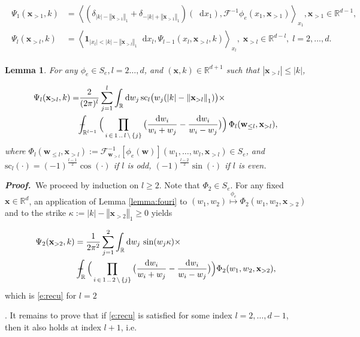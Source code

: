 \documentclass[11pt,A4,twoside]{article}
\newcommand\ind{\mathbf{1}}
\numberwithin{equation}{section}
\newcommand{\g}[1]{{\color{teal}#1}}
\newcommand{\RED}[1]{{\color{red}#1}}
\renewcommand{\r}[1]{\RED{#1}}
\newcommand{\intcc}{\dashint}
\newcommand{\F}{\mathcal{F}}
\renewcommand*\d{\mathop{}\!\mathrm{d}}
\newcommand{\norml}[1]{\left\Vert#1 \right\Vert_{1}}
\newcommand{\inner}[1]{\left\langle#1 \right\rangle}
\newcommand{\x}{\mathbf{x}}
\newcommand{\w}{\mathbf{w}}
\renewcommand{\sc}{\mathrm{sc}}
\newcommand{\R}{\mathbbm{R}}
\def\Phint#1{\mathchoice
  {\XXint\displaystyle\textstyle{#1}}%
  {\XXint\textstyle\scriptstyle{#1}}%
  {\XXint\scriptstyle\scriptscriptstyle{#1}}%
  {\XXint\scriptscriptstyle\scriptscriptstyle{#1}}%
  \!\int}
\def\XXint#1#2#3{{\setbox0=\hbox{$#1{#2#3}{\int}$}
    \vcenter{\hbox{$#2#3$}}\kern-.5\wd0}}
\def\dashint{\Phint-}
\def\qqq{\;\;\;\;\;\;\;\;\;}
\newcommand{\beqa}{\begin{eqnarray}}
\newcommand{\eeqa}{\end{eqnarray}}
\def\bal{\begin{aligned}}
\def\eal{\end{aligned}}
\def\bll#1{
\beqa\label{#1}\bal
}\def\lel{\eal\eeqa}
\newcommand{\beql}[1]{\bll{#1}}
\newcommand{\eeql}{\lel}
\newtheorem{lemma}[theorem]{Lemma}
\theoremstyle{definition}
\theoremstyle{remark}
\def\sp{,\;}
\def\R{\mathbb{R}}
\def\phie{\phi_e}
\def\proof{\noindent \emph{\textbf{Proof.} $\, $}}
\def\bigotimes{\prod}
\def\thel{m}\def\thel{l}%
\begin{document}
{{{%
\beql{e:phidef}
     \Psi_1(\x_{>1},k) & = \inner{(\delta_{|k|-\norml{\x_{>1}}} + \delta_{-|k|+\norml{\x_{>1}}})(\d x_1) ,\F^{-1}\phie(x_1,\x_{>1})}_{x_1}, \x_{>1}\in\R^{d-1},
        \\
    \Psi_l(\x_{>l},k) & = \inner{ \ind_{|x_l|<|k|-\norml{\x_{>l}}} \d x_l, \Psi_{l-1}(x_l, \x_{>l}, k)}_{x_l}
    \sp \x_{>l}\in\R^{d-l}\sp l = 2, \dots, d.
\eeql
\begin{lemma}\label{l:dcc2} %
For any $\phi_e \in S_e, \thel  = 2 \dots, d$,  and  $(\x,k)\in \R^{d+1}$ such that $|\x_{>\thel}|\leq |k|$, 
\beql{e:recu}
    \Psi_{\thel}(\x_{>\thel},k)=& \frac2{(2\pi)^{\thel}} \sum_{j = 1}^\thel \int_\R \d w_j \,\sc_{\thel }\big(w_j (|k|-\norml{\x_{>\thel}})\big) \times
        \\
& \intcc_{\R^{\thel-1 }}\Big(\bigotimes_{\jmath\, \in\, 1\,..\,\thel\, \setminus\,  \{j\}}\big(\frac{\d w_{\jmath}}{w_{\jmath} + w_{j}} - \frac{\d w_{\jmath}}{w_{\jmath} - w_{j}}\big) \Big)\,\Phi_{\thel } (\w_{\le l},\x_{>l})
  ,\\
\eeql
where
$ \displaystyle\Phi_{\thel } (\w_{\le l},\x_{>l}) 
:=\F^{-1}_{\w_{>\thel}}[\phie(\w)](w_1,\dots, w_l ,\x_{>\thel}) \in S_e$, and $\sc_{\thel }(\cdot)  =  (-1)^{\frac{\thel -1}{2}}  \cos(\cdot)$ if $\thel$ is odd, $(-1)^{\frac{\thel-2 }{2}} \sin(\cdot)$ if $\thel$ is even.
\end{lemma}
\proof We proceed by 
induction on $l\ge 2$. 
Note that 
$\displaystyle\Phi_{2 } \in S_e $.
For any fixed $\x\in\R^d$,
an application of Lemma  \ref{lemma:fouri} to $(w_1,w_2)\stackrel{\phi_e}{\longmapsto} \Phi_{2}(w_1,w_2,\x_{>2}) $ and to the strike $\kappa :=|k|-\norml{\x_{>2}}\ge 0 $ yields
\beql{e:rec}
    &\Psi_{2}(\x_{>2},k) = \frac{1}{2\pi^2}\sum_{j = 1}^2 \int_\R \d w_j \,\sin(w_j  \kappa 
    )  \times\\
    &\qqq\qqq\intcc_\R \Big(\bigotimes_{\jmath\, \in\, 1\,..\,2\, \setminus\,  \{j\}} \big(\frac{\d w_{\jmath}}{w_{\jmath} + w_{j}} - \frac{\d w_{\jmath}}{w_{\jmath} - w_{j}}\big)\Big) \Phi_{2}(w_1,w_2,\x_{>2}),
\eeql
 which is \eqref{e:recu} for $\thel =2$}.
It remains to prove that if \eqref{e:recu} is satisfied for some index  $\thel  = 2, \dots, d-1$, then it also holds at index $\thel +1$, i.e.
}}
\end{document}

